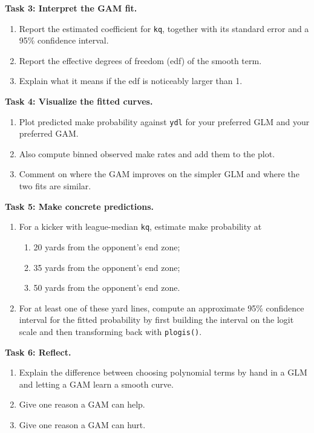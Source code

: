 \documentclass[twoside]{article}
\theoremstyle{definition}
\begin{document}
\textbf{Task 3: Interpret the GAM fit.}
\begin{enumerate}
    \item[-] Report the estimated coefficient for \texttt{kq}, together with its standard error and a 95\% confidence interval.
    \item[-] Report the effective degrees of freedom (edf) of the smooth term.
    \item[-] Explain what it means if the edf is noticeably larger than 1.
\end{enumerate}

\textbf{Task 4: Visualize the fitted curves.}
\begin{enumerate}
    \item[-] Plot predicted make probability against \texttt{ydl} for your preferred GLM and your preferred GAM.
    \item[-] Also compute binned observed make rates and add them to the plot.
    \item[-] Comment on where the GAM improves on the simpler GLM and where the two fits are similar.
\end{enumerate}

\textbf{Task 5: Make concrete predictions.}
\begin{enumerate}
    \item[-] For a kicker with league-median \texttt{kq}, estimate make probability at
    \begin{enumerate}
        \item 20 yards from the opponent's end zone;
        \item 35 yards from the opponent's end zone;
        \item 50 yards from the opponent's end zone.
    \end{enumerate}
    \item[-] For at least one of these yard lines, compute an approximate 95\% confidence interval for the fitted probability by first building the interval on the logit scale and then transforming back with \texttt{plogis()}.
\end{enumerate}

\textbf{Task 6: Reflect.}
\begin{enumerate}
    \item[-] Explain the difference between choosing polynomial terms by hand in a GLM and letting a GAM learn a smooth curve.
    \item[-] Give one reason a GAM can help.
    \item[-] Give one reason a GAM can hurt.
\end{enumerate}

\color{black}
\end{document}
